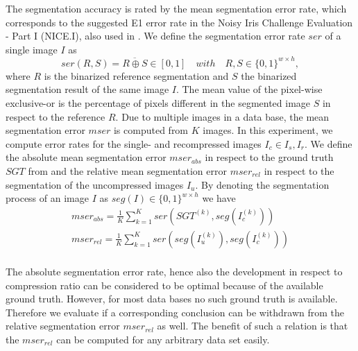 \documentclass[10pt,twocolumn,letterpaper]{article}
\begin{document}
The segmentation accuracy is rated by the mean segmentation error rate, which corresponds to the suggested E1 error rate in the Noisy Iris Challenge Evaluation - Part I (NICE.I), also used in \cite{severeCompression}. We define the segmentation error rate $ser$ of a single image $I$ as
\begin{equation}
ser(R,S) = \overline{R \oplus S} \in [0,1]\quad with \quad R,S \in \{0,1\}^{w \times h},
\end{equation} where $R$ is the binarized reference segmentation and $S$ the binarized segmentation result of the same image $I$. The mean value of the pixel-wise exclusive-or is the percentage of pixels different in the segmented image $S$ in respect to the reference $R$. Due to multiple images in a data base, the mean segmentation error $mser$ is computed from $K$ images. In this experiment, we compute error rates for the single- and recompressed images $I_c \in {I_s, I_r}$. We define the absolute mean segmentation error $mser_{abs}$ in respect to the ground truth $SGT$ from \cite{severeCompression} and the relative mean segmentation error $mser_{rel}$ in respect to the segmentation of the uncompressed images $I_u$. By denoting the segmentation process of an image $I$ as $seg(I) \in \{0,1\}^{w \times h}$ we have
\begin{eqnarray}
mser_{abs} = \frac{1}{K}\sum_{k=1}^{K}ser(SGT^{(k)},seg(I_c^{(k)})) \label{equ:mserabs} \\
mser_{rel} = \frac{1}{K}\sum_{k=1}^{K}ser(seg(I_u^{(k)}),seg(I_c^{(k)})) \label{equ:mserrel} \\
\end{eqnarray}

The absolute segmentation error rate, hence also the development in respect to compression ratio can be considered to be optimal because of the available ground truth. However, for most data bases no such ground truth is available. Therefore we evaluate if a corresponding conclusion can be withdrawn from the relative segmentation error $mser_{rel}$ as well. The benefit of such a relation is that the $mser_{rel}$ can be computed for any arbitrary data set easily. 
\end{document}
